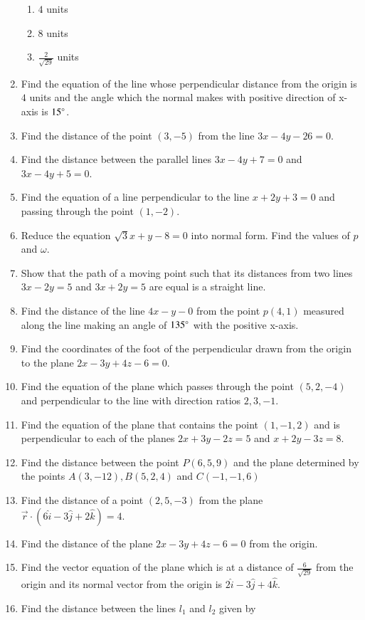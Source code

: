 \begin{enumerate}[label=\thesubsection.\arabic*,ref=\thesubsection.\theenumi]
\begin{enumerate}
\item $4$ units
\item $8$ units
\item $\frac{2}{\sqrt{29}}$ units
\end{enumerate}
\item Find the equation of the line whose perpendicular distance from the origin is $4$ units and the angle which the normal makes with positive direction of x-axis is $15\degree$.
\item Find the distance of the point $(3,-5)$ from the line $3x-4y-26=0$.
\item Find the distance between the parallel lines $3x-4y+7=0$ and $3x-4y+5=0$.
\item Find the equation of a line perpendicular to the line $x+2y+3=0$ and passing through the point $(1,-2)$.
\item Reduce the equation $\sqrt3x+y-8=0$ into normal form. Find the values of $p$ and $\omega$.
\item Show that the path of a moving point such that its distances from two lines $3x-2y=5$ and $3x+2y=5$ are equal is a straight line.
\item Find the distance of the line $4x-y-0$ from the point $p(4,1)$ measured along the line making an angle of $135\degree$ with the positive x-axis.
\item Find the coordinates of the foot of the perpendicular drawn from the origin to the plane $2x -3y +4z -6 = 0$.
\item Find the equation of the plane which passes through the point $(5, 2, -4)$ and perpendicular to the line with direction ratios $2, 3, -1$.
\item Find the equation of the plane that contains the point $(1, -1, 2)$ and is perpendicular to each of the planes $2x +3y -2z =5$ and $x +2y -3z =8$.
\item Find the distance between the point $P(6, 5, 9)$ and the plane determined by the points $A(3, -1 2), B( 5, 2,4)$ and $C(-1, -1, 6)$
\item Find the distance of a point $(2, 5, -3)$ from the plane $\overrightarrow{r} \cdot (6\hat{i} -3\hat{j} +2\hat{k}) =4$.
\item Find the distance of the plane $2x- 3y+ 4z- 6= 0$ from the origin.
\item Find the vector equation of the plane which is at a distance of $\frac{6}{\sqrt{29}}$ from the origin and its normal vector from the origin is $2 \hat{i}- 3 \hat{j}+ 4 \hat{k}$. 
\item Find the distance between the lines $l_1$ and $l_2$ given by

\end{enumerate}
